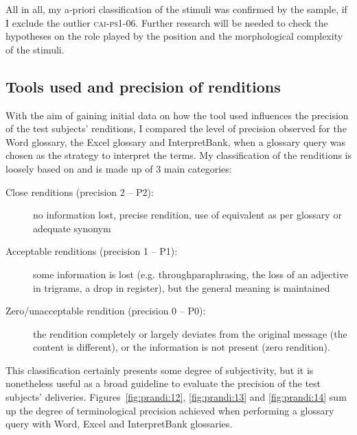 \documentclass[output=paper]{langsci/langscibook}
\begin{document}
All in all, my a-priori classification of the stimuli was confirmed by the sample, if I exclude the outlier \textsc{cai}-\textsc{ps1-06}. Further research will be needed to check the hypotheses on the role played by the position and the morphological complexity of the stimuli.


\subsection{Tools used and precision of renditions}\label{sec:prandi:5.2}

With the aim of gaining initial data on how the tool used influences the precision of the test subjects’ renditions, I compared the level of precision observed for the Word glossary, the Excel glossary and InterpretBank, when a glossary query was chosen as the strategy to interpret the terms. My classification of the renditions is loosely based on \citet{Wadensjö1998} and is made up of 3 main categories:

\begin{description}
\item[Close renditions (precision 2 – P2):] no information lost, precise rendition, use of equivalent as per glossary or adequate synonym
\item[Acceptable renditions (precision 1 – P1):] some information is lost (e.g. through\linebreak paraphrasing, the loss of an adjective in trigrams, a drop in register), but the general meaning is maintained
\item[Zero/unacceptable rendition (precision 0 – P0):] the rendition completely or largely deviates from the original message (the content is different), or the information is not present (zero rendition).
\end{description}

This classification certainly presents some degree of subjectivity, but it is none\-theless useful as a broad guideline to evaluate the precision of the test subjects’ deliveries. Figures~\ref{fig:prandi:12}, \ref{fig:prandi:13} and \ref{fig:prandi:14} sum up the degree of terminological precision achieved when performing a glossary query with Word, Excel and InterpretBank glossaries. 
\end{document}
